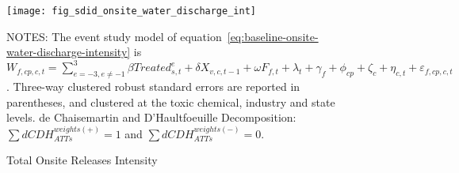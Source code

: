 \begin{figure}[H]
    \centering
    \texttt{[image: fig\_sdid\_onsite\_water\_discharge\_int]}
    \caption{Total Onsite Releases Intensity}
    \label{fig:baseline-onsite-water-discharge-intensity}
    \begin{minipage}{18cm}
        \vspace{0.05in}
        NOTES: The event study model of equation~\ref{eq:baseline-onsite-water-discharge-intensity} is $W_{f,cp,c,t} = \sum_{{e = -3},{e \neq -1}}^{3} \beta Treated_{s,t}^e + \delta X_{v,c,t-1} + \omega F_{f,t} + \lambda_{t} + \gamma_{f} + \phi_{cp} + \zeta_{c} + \eta_{c,t} + \varepsilon_{f,cp,c,t}$. Three-way clustered robust standard errors are reported in parentheses, and clustered at the toxic chemical, industry and state levels. de Chaisemartin and D'Haultfoeuille Decomposition: $\sum dCDH_{ATTs}^{weights(+)} = 1$ and $\sum dCDH_{ATTs}^{weights(-)} = 0$.
    \end{minipage}
\end{figure}